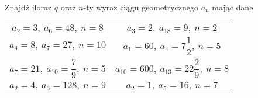 \documentclass[a4paper,12pt,leqno,fleqn]{article}
\begin{document}
\newpage
Znajdź iloraz $q$ oraz $n$-ty wyraz ciągu geometrycznego $a_n$ mając dane

\begin{tabularx}{\linewidth}{@{}XX@{}}

  \begin{equation}
    a_2=3,\:a_6=48,\:n=8
  \end{equation}
&
  \begin{equation}
    a_3=2,\:a_{18}=9,\:n=2
  \end{equation}
\\
  \begin{equation}
    a_4=8,\:a_7=27,\:n=10
  \end{equation}
&
  \begin{equation}
    a_1=60,\:a_4=7\frac{1}{2},\:n=5
  \end{equation}
\\
  \begin{equation}
    a_7=21,\:a_{10}=\frac{7}{9},\:n=5
  \end{equation}
&
  \begin{equation}
    a_{10}=600,\:a_{13}=22\frac{2}{9},\:n=8
  \end{equation}
\\
  \begin{equation}
    a_2=4,\:a_6=128,\:n=9
  \end{equation}
&
  \begin{equation}
    a_2=1,\:a_{5}=16,\:n=7
  \end{equation}
\\
\end{tabularx}
\end{document}
